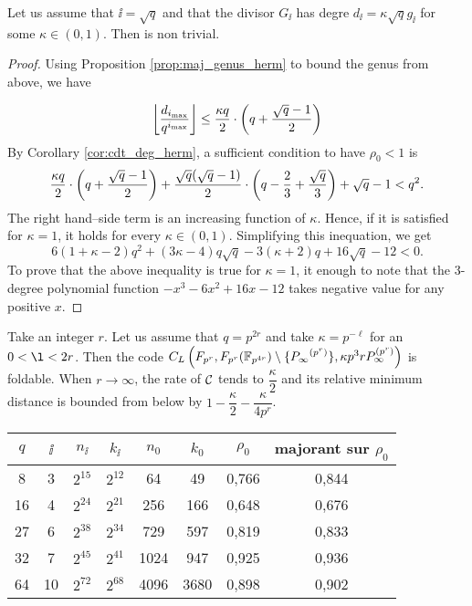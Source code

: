 \documentclass[10pt]{article}
\begin{document}
\begin{proposition}
	Let us assume that $\ii=\sqrt{q}$ and that the divisor $G_{\ii}$ has degre $d_{\ii} = \kappa \sqrt{q}g_{\ii}$ for some $\kappa \in (0,1)$.
	Then  is non trivial. 
\end{proposition}
\begin{proof}
	Using Proposition \ref{prop:maj_genus_herm} to bound the genus from above, we have
	
	\[ \left\lfloor\dfrac{d_{i_{\rm{max}}}}{q^{i_{\rm{max}}}}\right\rfloor \leq  \dfrac{\kappa q}{2} \cdot \left( q + \dfrac{\sqrt{q}-1}{2} \right)\]
	By Corollary \ref{cor:cdt_deg_herm}, a sufficient condition to have $\rho_0 < 1$ is
	\[\dfrac{\kappa q}{2} \cdot \left( q + \dfrac{\sqrt{q}-1}{2} \right)+\dfrac{\sqrt{q}(\sqrt{q}-1)}{2}\cdot \left(q-\frac{2}{3} + \frac{\sqrt{q}}{3}\right) + \sqrt{q}-1 < q^2.\]
	The right hand--side term is an increasing function of $\kappa$. Hence, if it is satisfied for $\kappa=1$, it holds for every $\kappa \in (0,1)$. Simplifying this inequation, we get 
	\[6(1+\kappa - 2) q^2 + (3\kappa-4)q\sqrt{q}-3(\kappa+2)q+16\sqrt{q}-12 <0.\]
	To prove that the above inequality is true for $\kappa=1$, it enough to note that the 3-degree polynomial function $-x^3-6x^2+16x-12$ takes negative value for any positive $x$.
\end{proof}

Take an integer $r$. Let us assume that $q=p^{2r}$ and take $\kappa=p^{-\ell}$ for an $0<\l<2r$. Then the code $C_L\left(F_{p^r},F_{p^r}( \mathbb{F}_{p^{4r}} )\setminus\{ {P_\infty}^{(p^r)} \}, \kappa p^3rP_\infty^{(p^r)}\right)$ is foldable. When $r \rightarrow \infty$, the rate of $\mathcal{C}$ tends to $\dfrac{\kappa}{2}$ and its relative minimum distance is bounded from below by $1-\dfrac{\kappa}{2}-\dfrac{\kappa}{4p^r}$.


\newpage

\begin{center}
\begin{tabular}{|c|c|c|c|c|c|c|c|}
\hline
$q$ & $\ii$ & $n_{\ii}$ & $k_{\ii}$ & $n_0$ & $k_0$ & $\rho_0$ & majorant sur $\rho_0$ \\ 
\hline
8 & 3 & $2^{15}$ & $2^{12}$ & 64 & 49 & 0,766 & 0,844 \\
\hline
16 & 4 & $2^{24}$ & $2^{21}$ & 256 & 166 & 0,648 & 0,676 \\
\hline
27 & 6 & $2^{38}$ & $2^{34}$ & 729 & 597 & 0,819 & 0,833 \\
\hline
32 & 7 & $2^{45}$ & $2^{41}$ & 1024 & 947 & 0,925 & 0,936 \\
\hline
64 & 10 & $2^{72}$ & $2^{68}$ & 4096 & 3680 & 0,898 & 0,902 \\
\hline
\end{tabular}
\end{center}
\end{document}
